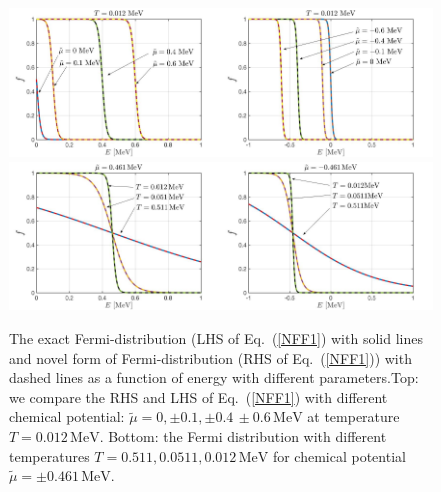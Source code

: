 \documentclass[sn-mathphys,Numbered]{sn-jnl}
\begin{document}
\begin{figure}[ht]
\begin{center}
\includegraphics[width=0.5\textwidth]{./plot/Fermi_novel_001}\includegraphics[width=0.5\textwidth]{./plot/Fermi_novel_002}
\includegraphics[width=0.5\textwidth]{./plot/Fermi_novel_003}\includegraphics[width=0.5\textwidth]{./plot/Fermi_novel_004}
\caption{The exact Fermi-distribution (LHS of Eq.~(\ref{NFF1}) with solid lines and novel form of Fermi-distribution (RHS of Eq.~(\ref{NFF1})) with dashed lines as a function of energy with different parameters.Top: we compare the RHS and LHS of Eq.~(\ref{NFF1}) with different chemical potential: $\widetilde\mu=0, \pm0.1, \pm0.4\,\pm0.6\, \mathrm{MeV}$ at temperature $T=0.012\,\mathrm{MeV}$. Bottom: the Fermi distribution with different temperatures $T=0.511, 0.0511, 0.012\,\mathrm{MeV}$ for chemical potential $\widetilde\mu=\pm0.461\,\mathrm{MeV}$.}
\label{Fermi_Checking}
\end{center}
\end{figure}
\end{document}
